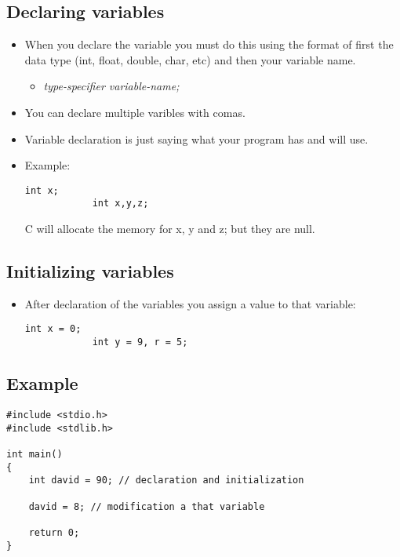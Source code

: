 \subsection{Declaring variables}
\begin{itemize}
    \item When you declare the variable you must do this using the format of first the data type (int, float, double, char, etc) and then your variable name.
        \begin{itemize}
            \item \emph{type-specifier variable-name;}
        \end{itemize}
    \item You can declare multiple varibles with comas. 
    \item Variable declaration is just saying what your program has and will use. 
    \item Example:
        \begin{Verbatim}[breaklines=true, breakanywhere=true]
            int x;
            int x,y,z;
        \end{Verbatim}
        C will allocate the memory for x, y and z; but they are null.
\end{itemize}
\subsection{Initializing variables}
\begin{itemize}
    \item After declaration of the variables you assign a value to that variable:
        \begin{Verbatim}[breaklines=true, breakanywhere=true]
            int x = 0;
            int y = 9, r = 5;
        \end{Verbatim}
\end{itemize}
\subsection{Example}
\begin{Verbatim}[breaklines=true, breakanywhere=true]
#include <stdio.h>
#include <stdlib.h>

int main()
{
    int david = 90; // declaration and initialization
    
    david = 8; // modification a that variable
    
    return 0;
}

\end{Verbatim}

